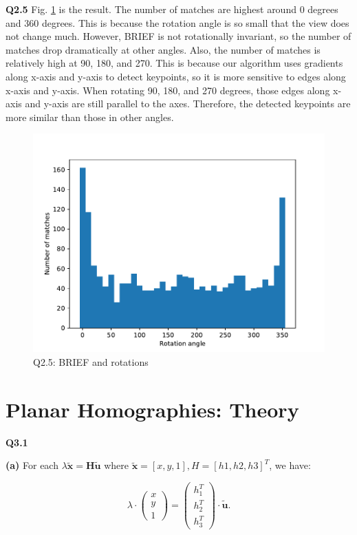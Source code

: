 \documentclass[
  course = {{16-720B Computer Vision}},
  quartile = {{1}},
  assignment = 4\ -\ Feature\ Descriptors\ \&\ Homographies\ \& \  RANSAC,
  name = {{Kangle Deng}},
  email = {{kangled@andrew.cmu.edu}},
  firstexercise = 1
]{aga-homework}
\begin{document}
\noindent \textbf{Q2.5} Fig. \ref{fig:cv_hw4_q25} is the result. The number of matches are highest around 0 degrees and 360 degrees. This is because the rotation angle is so small that the view does not change much. However, BRIEF is not rotationally invariant, so the number of matches drop dramatically at other angles.  Also, the number of matches is relatively high at 90, 180, and 270. This is because our algorithm uses gradients along x-axis and y-axis to detect keypoints, so it is more sensitive to edges along x-axis and y-axis. When rotating 90, 180, and 270 degrees, those edges along x-axis and y-axis are still parallel to the axes. Therefore, the detected keypoints are more similar than those in other angles.

\begin{figure}
    \centering
    \includegraphics{CV/fig/hw4/q25.pdf}
    \caption{Q2.5: BRIEF and rotations}
    \label{fig:cv_hw4_q25}
\end{figure}

\section{Planar Homographies: Theory}
\noindent \textbf{Q3.1} 

\noindent \textbf{(a)} For each $\lambda \tilde{\mathbf{x}} = \mathbf{H} \tilde{\mathbf{u}}$ where $\tilde{\mathbf{x}} = [x, y, 1], H = [h1, h2, h3]^T$, we have:

\begin{equation*}
    \lambda \cdot \left(
    \begin{array}{c}
        x \\
        y \\
        1
    \end{array}
    \right) = \left(
    \begin{array}{c}
        h_1^T \\
        h_2^T \\
        h_3^T
    \end{array}
    \right) \cdot \tilde{\mathbf{u}}. 
\end{equation*}
\end{document}
